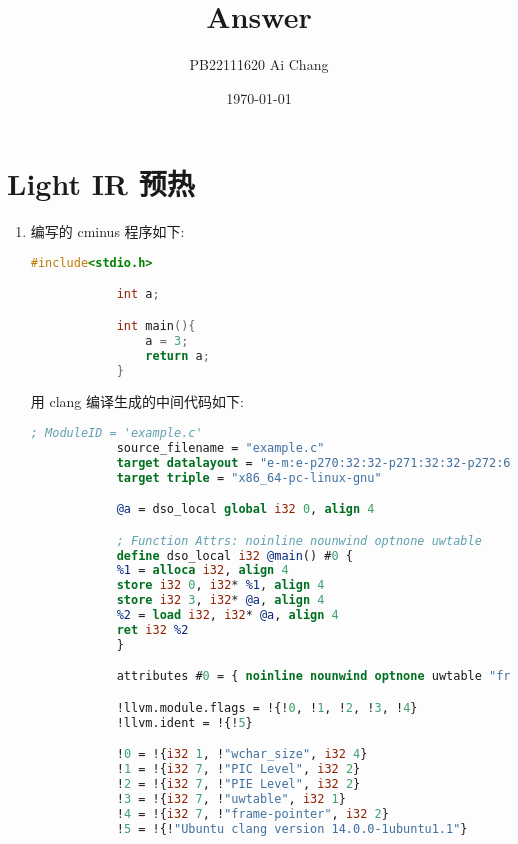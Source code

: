 \documentclass[UTF8]{ctexart}
\title{Answer}
\author{PB22111620 Ai Chang}
\date{\today}
\begin{document}
\begin{sloppypar}

\maketitle

\section{Light IR 预热}
\begin{enumerate}
    \item 编写的 cminus 程序如下:
        \begin{lstlisting}[language = C, title=example.c]
            #include<stdio.h>

            int a;

            int main(){
                a = 3;
                return a;
            }
        \end{lstlisting}

        用 clang 编译生成的中间代码如下:
        \begin{lstlisting}[language = llvm, title=example.ll]
            ; ModuleID = 'example.c'
            source_filename = "example.c"
            target datalayout = "e-m:e-p270:32:32-p271:32:32-p272:64:64-i64:64-f80:128-n8:16:32:64-S128"
            target triple = "x86_64-pc-linux-gnu"

            @a = dso_local global i32 0, align 4

            ; Function Attrs: noinline nounwind optnone uwtable
            define dso_local i32 @main() #0 {
            %1 = alloca i32, align 4
            store i32 0, i32* %1, align 4
            store i32 3, i32* @a, align 4
            %2 = load i32, i32* @a, align 4
            ret i32 %2
            }

            attributes #0 = { noinline nounwind optnone uwtable "frame-pointer"="all" "min-legal-vector-width"="0" "no-trapping-math"="true" "stack-protector-buffer-size"="8" "target-cpu"="x86-64" "target-features"="+cx8,+fxsr,+mmx,+sse,+sse2,+x87" "tune-cpu"="generic" }

            !llvm.module.flags = !{!0, !1, !2, !3, !4}
            !llvm.ident = !{!5}

            !0 = !{i32 1, !"wchar_size", i32 4}
            !1 = !{i32 7, !"PIC Level", i32 2}
            !2 = !{i32 7, !"PIE Level", i32 2}
            !3 = !{i32 7, !"uwtable", i32 1}
            !4 = !{i32 7, !"frame-pointer", i32 2}
            !5 = !{!"Ubuntu clang version 14.0.0-1ubuntu1.1"}
        \end{lstlisting}


\end{enumerate}
\end{sloppypar}
\end{document}
